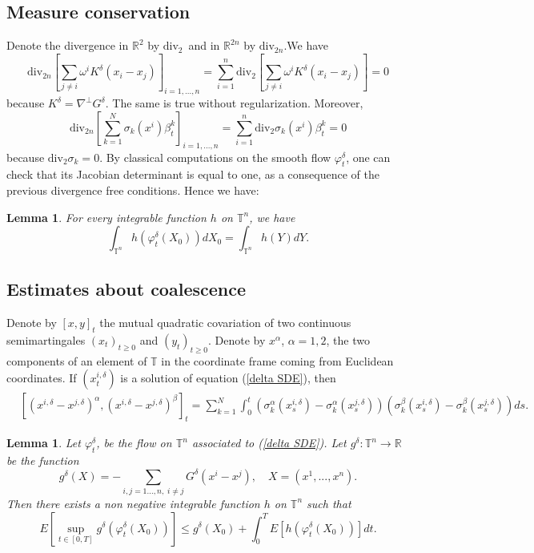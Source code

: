 \documentclass[11pt,a4paper]{article}%
\newtheorem{lemma}[theorem]{Lemma}
\begin{document}
\subsection{Measure conservation}

Denote the divergence in $\mathbb{R}^{2}$ by $\mathrm{div}_{2}$\ and in
$\mathbb{R}^{2n}$ by $\mathrm{div}_{2n}$.We have
\[
\mathrm{div}_{2n}[ \sum_{j\neq i}\omega^{i}K^{\delta}( x_{i}-x_{j}) ]
_{i=1,...,n}=\sum_{i=1}^{n}\mathrm{div}_{2}[ \sum_{j\neq i}\omega^{i}%
K^{\delta}( x_{i}-x_{j}) ] =0
\]
because $K^{\delta}=\nabla^{\perp}G^{\delta}$. The same is true without
regularization. Moreover,
\[
\mathrm{div}_{2n}[ \sum_{k=1}^{N}\sigma_{k}( x^{i}) \beta_{t}^{k}]
_{i=1,...,n}=\sum_{i=1}^{n}\mathrm{div}_{2}\sigma_{k}( x^{i}) \beta_{t}^{k}=0
\]
because $\mathrm{div}_{2}\sigma_{k}=0$. By classical computations on the
smooth flow $\varphi_{t}^{\delta}$, one can check that its Jacobian
determinant is equal to one, as a consequence of the previous divergence free
conditions. Hence we have:

\begin{lemma}
\label{conservation}For every integrable function $h$ on ${\mathbb{T}}^{n}$,
we have
\[
\int_{{\mathbb{T}}^{n}}h( \varphi_{t}^{\delta}( X_{0}) ) dX_{0}=\int
_{{\mathbb{T}}^{n}}h( Y) dY.
\]

\end{lemma}

\subsection{Estimates about coalescence}

Denote by $[ x,y] _{t}$ the mutual quadratic covariation of two continuous
semimartingales $( x_{t}) _{t\geq0}$ and $( y_{t}) _{t\geq0}$. Denote by
$x^{\alpha}$, $\alpha=1,2$, the two components of an element of ${\mathbb{T}}$
in the coordinate frame coming from Euclidean coordinates. If $(
x_{t}^{i,\delta}) $ is a solution of equation (\ref{delta SDE}), then
\begin{align*}
&  [ ( x^{i,\delta}-x^{j,\delta}) ^{\alpha},( x^{i,\delta}-x^{j,\delta})
^{\beta}] _{t}
=\sum_{k=1}^{N}\int_{0}^{t}( \sigma_{k}^{\alpha}( x_{s}^{i,\delta})
-\sigma_{k}^{\alpha}( x_{s}^{j,\delta}) ) ( \sigma_{k}^{\beta}( x_{s}%
^{i,\delta}) -\sigma_{k}^{\beta}( x_{s}^{j,\delta}) ) ds.
\end{align*}


\begin{lemma}
Let $\varphi_{t}^{\delta}$, be the flow on ${\mathbb{T}}^{n}$ associated to
(\ref{delta SDE}). Let $g^{\delta}:{\mathbb{T}}^{n}\rightarrow\mathbb{R}$ be
the function
\[
g^{\delta}( X) =-\sum_{i,j=1...,n,\;i\neq j}G^{\delta}( x^{i}-x^{j}) ,\quad
X=( x^{1},...,x^{n}) .
\]
Then there exists a non negative integrable function $h$ on ${\mathbb{T}}^{n}$
such that
\[
E[ \sup_{t\in[ 0,T] }g^{\delta}( \varphi_{t}^{\delta}( X_{0}) ) ] \leq
g^{\delta}( X_{0}) +\int_{0}^{T}E[ h( \varphi_{t}^{\delta}( X_{0}) ) ] dt.
\]

\end{lemma}
\end{document}
